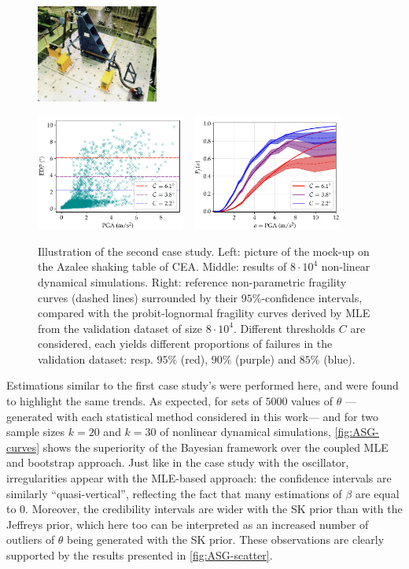 \begin{figure}[h]
    \centering
    \parbox[b][3.8cm][c]{4.5cm}{%
    \includegraphics[height=3.2cm]{figures/intro-frags/ASG.jpg}\vspace*{1em}%
    }
    \includegraphics[height=3.8cm]{figures/intro-frags/asg/cloud_PGA_light.pdf}\ \ 
    \includegraphics[height=3.8cm]{figures/intro-frags/asg/refs_PGA.pdf}
    \caption{Illustration of the second case study. Left: picture of the mock-up on the Azalee shaking table of CEA. Middle: results of $8\cdot10^4$ non-linear dynamical simulations. Right: reference non-parametric fragility curves (dashed lines) surrounded by their $95\%$-confidence intervals, compared with the probit-lognormal fragility curves derived by MLE from the validation dataset of size $8\cdot 10^4$. Different thresholds $C$ are considered, each yields different proportions of failures in the validation dataset: resp. $95\%$ (red), $90\%$ (purple) and $85\%$ (blue).}
    \label{fig:PREM:asg}
\end{figure}




Estimations similar to the first case study’s were performed here, and were found to highlight the same trends.
As expected, for sets of $5000$ values of $\theta$ ---generated with each statistical method considered in this work--- and for two sample sizes $k = 20$ and $k = 30$ of nonlinear dynamical simulations, \cref{fig:ASG-curves} shows the superiority of the Bayesian framework over the coupled MLE and bootstrap approach. Just like in the case study with the oscillator, irregularities appear with the MLE-based approach: the confidence intervals are similarly ``quasi-vertical'', reflecting the fact that many estimations of $\beta$ are equal to $0$. Moreover, the credibility intervals are wider with the SK prior than with the Jeffreys prior, which here too can be interpreted as an increased number of outliers of $\theta$ being generated with the SK prior. These observations are clearly supported by the results presented in \cref{fig:ASG-scatter}.


